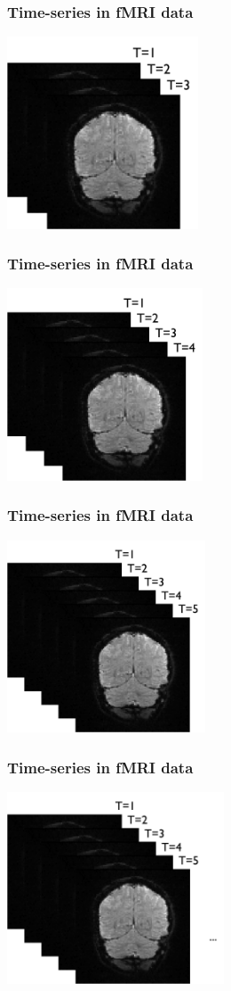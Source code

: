 \documentclass{beamer}
\begin{document}
\begin{frame}
\frametitle{Time-series in fMRI data}
\includegraphics[height=5.7cm]{figures/t1_2_3}
\end{frame}

\begin{frame}
\frametitle{Time-series in fMRI data}
\includegraphics[height=5.7cm]{figures/t1_2_3_4}
\end{frame}

\begin{frame}
\frametitle{Time-series in fMRI data}
\includegraphics[height=5.7cm]{figures/t1_2_3_4_5}
\end{frame}

\begin{frame}
\frametitle{Time-series in fMRI data}
\includegraphics[height=5.7cm]{figures/t1_5_etc}
\end{frame}
\end{document}
